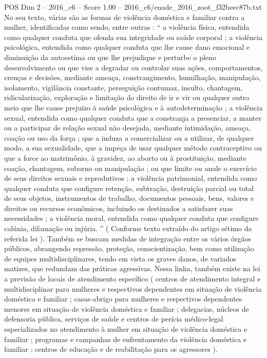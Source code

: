 \begin{textsample}{POS Dim 2 – 2016\_c6 – Score 1.00 – 2016\_c6/enade\_2016\_zoot\_f32beec87b.txt}
No seu texto, várias são as formas de violência doméstica e familiar contra a mulher, identificadas como sendo, entre outras : “ a violência física, entendida como qualquer conduta que ofenda sua integridade ou saúde corporal ; a violência psicológica, entendida como qualquer conduta que lhe cause dano emocional e diminuição da autoestima ou que lhe prejudique e perturbe o pleno desenvolvimento ou que vise a degradar ou controlar suas ações, comportamentos, crenças e decisões, mediante ameaça, constrangimento, humilhação, manipulação, isolamento, vigilância constante, perseguição contumaz, insulto, chantagem, ridicularização, exploração e limitação do direito de ir e vir ou qualquer outro meio que lhe cause prejuízo à saúde psicológica e à autodeterminação ; a violência sexual, entendida como qualquer conduta que a constranja a presenciar, a manter ou a participar de relação sexual não desejada, mediante intimidação, ameaça, coação ou uso da força ; que a induza a comercializar ou a utilizar, de qualquer modo, a sua sexualidade, que a impeça de usar qualquer método contraceptivo ou que a force ao matrimônio, à gravidez, ao aborto ou à prostituição, mediante coação, chantagem, suborno ou manipulação ; ou que limite ou anule o exercício de seus direitos sexuais e reprodutivos ; a violência patrimonial, entendida como qualquer conduta que configure retenção, subtração, destruição parcial ou total de seus objetos, instrumentos de trabalho, documentos pessoais, bens, valores e direitos ou recursos econômicos, incluindo os destinados a satisfazer suas necessidades ; a violência moral, entendida como qualquer conduta que configure calúnia, difamação ou injúria. ” ( Conforme texto extraído do artigo sétimo da referida lei ).
Também se buscam medidas de integração entre os vários órgãos públicos, abrangendo repressão, proteção, conscientização, bem como utilização de equipes multidisciplinares, tendo em vista os graves danos, de variados matizes, que redundam das práticas agressivas.
Nessa linha, também existe na lei a previsão de locais de atendimento específico ( centros de atendimento integral e multidisciplinar para mulheres e respectivos dependentes em situação de violência doméstica e familiar ; casas-abrigo para mulheres e respectivos dependentes menores em situação de violência doméstica e familiar ; delegacias, núcleos de defensoria pública, serviços de saúde e centros de perícia médico-legal especializados no atendimento à mulher em situação de violência doméstica e familiar ; programas e campanhas de enfrentamento da violência doméstica e familiar ; centros de educação e de reabilitação para os agressores ).

\end{textsample}
